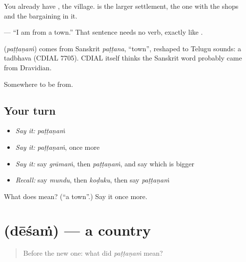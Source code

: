 You already have , the village.  is the larger settlement, the one with the shops and the bargaining in it.

\textbf{  } — \textquotedblleft{}I am from a town.\textquotedblright{} That sentence needs no verb, exactly like  .

\begin{cousinweb}
\textbf{} (\emph{paṭṭaṇaṁ}) comes from Sanskrit \emph{paṭṭana}, \textquotedblleft{}town\textquotedblright{}, reshaped to Telugu sounds: a tadbhava (CDIAL 7705). CDIAL itself thinks the Sanskrit word probably came from Dravidian.
\end{cousinweb}

\begin{grammarlens}[title={What you've built}]
Somewhere to be from.
\end{grammarlens}

\subsection*{Your turn}
\begin{itemize}
\raggedright
  \item \emph{Say it:} \emph{paṭṭaṇaṁ}
  \item \emph{Say it:} \emph{paṭṭaṇaṁ}, once more
  \item \emph{Say it:} say \emph{grāmaṁ}, then \emph{paṭṭaṇaṁ}, and say which is bigger
  \item \emph{Recall:} say \emph{mundu}, then \emph{koḍuku}, then say \emph{paṭṭaṇaṁ}
\end{itemize}

\begin{tcolorbox}[breakable,colback=teal!4,colframe=teal!35!black,title={Before you move on}]
What does  mean? (\textquotedblleft{}a town\textquotedblright{}.) Say it once more.
\end{tcolorbox}
\section[\texorpdfstring{\te{దేశం} (dēśaṁ)}{దేశం (dēśaṁ)}]{ (dēśaṁ) — a country}

\label{lesson:TE-C77-country}



\begin{quote}
Before the new one: what did \emph{paṭṭaṇaṁ} mean?
\end{quote}

